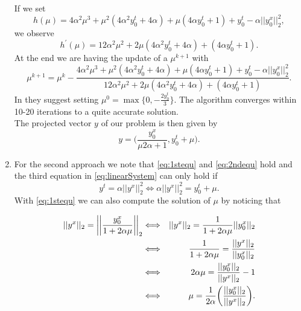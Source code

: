 \begin{enumerate}
                If we set
                $$
                    h(\mu) = 4 \alpha^{2} \mu^{3} + \mu^{2} (4 \alpha^{2} y_{0}^{t} + 4 \alpha) + \mu(4 \alpha y_{0}^{t} + 1) + y_{0}^{t} - \alpha ||y_{0}^{x}||_{2}^{2},
                $$
                we observe
                $$
                    h^{'}(\mu) = 12 \alpha^{2} \mu^{2} + 2 \mu (4 \alpha^{2} y_{0}^{t} + 4 \alpha) + (4 \alpha y_{0}^{t} + 1).
                $$
                At the end we are having the update of a $\mu^{k+1}$ with
                \begin{equation}
                    \mu^{k+1} = \mu^{k} - \frac{4 \alpha^{2} \mu^{3} + \mu^{2} (4 \alpha^{2} y_{0}^{t} + 4 \alpha) + \mu(4 \alpha y_{0}^{t} + 1) + y_{0}^{t} - \alpha ||y_{0}^{x}||_{2}^{2}}{12 \alpha^{2} \mu^{2} + 2 \mu (4 \alpha^{2} y_{0}^{t} + 4 \alpha) + (4 \alpha y_{0}^{t} + 1)}.
                \end{equation}
                In \cite{Chambolle-et-al-10} they suggest setting $\mu^{0} = \max \{ 0, - \frac{2 y_{0}^{t}}{3} \}$. The algorithm converges within 10-20 iterations to a quite accurate solution.\\
                The projected vector $y$ of our problem is then given by
                \begin{equation}
                    y = \bigg( \frac{y_{0}^{x}}{\mu 2 \alpha + 1}, y_{0}^{t} + \mu \bigg). \label{eq:newtonSolution}
                \end{equation}

                \item For the second approach we note that \ref{eq:1stequ} and \ref{eq:2ndequ} hold and the third equation in \ref{eq:linearSystem} can only hold if
                \begin{equation}
                    y^{t} = \alpha ||y^{x}||_{2}^{2} \Longleftrightarrow \alpha ||y^{x}||_{2}^{2} = y_{0}^{t} + \mu. \label{eq:tmp1}
                \end{equation}
                With \ref{eq:1stequ} we can also compute the solution of $\mu$ by noticing that

                \begin{eqnarray}
                    ||y^{x}||_{2} = \bigg|\bigg| \frac{y_{0}^{x}}{1 + 2 \alpha \mu} \bigg|\bigg|_{2} &\Longleftrightarrow& ||y^{x}||_{2} = \frac{1}{1 + 2 \alpha \mu} ||y_{0}^{x}||_{2} \notag \\
                    &\Longleftrightarrow& \frac{1}{1 + 2 \alpha \mu} = \frac{||y^{x}||_{2}}{||y_{0}^{x}||_{2}} \notag \\
                    &\Longleftrightarrow& 2 \alpha \mu = \frac{||y_{0}^{x}||_{2}}{||y^{x}||_{2}} - 1 \notag \\
                    &\Longleftrightarrow& \mu = \frac{1}{2 \alpha} \bigg( \frac{||y_{0}^{x}||_{2}}{||y^{x}||_{2}} \bigg). \notag
                \end{eqnarray}


\end{enumerate}
